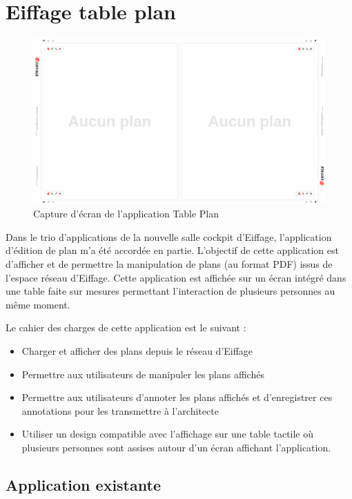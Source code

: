 \section{Eiffage table plan}
\label{eiffageTablePlan}

\begin{figure}[h]
    \centering
    \includegraphics[scale=0.5]{img/table-plan-capture.png}
    \caption{Capture d'écran de l'application Table Plan}
\end{figure}

Dans le trio d'applications de la nouvelle salle cockpit d'Eiffage, l'application d'édition de plan m'a été accordée en partie.
L'objectif de cette application est d'afficher et de permettre la manipulation de plans (au format PDF) issus de  l'espace réseau d'Eiffage.
Cette application est affichée sur un écran intégré dans une table faite sur mesures permettant l'interaction de plusieurs personnes au même moment.

Le cahier des charges de cette application est le suivant :
\begin{itemize}
    \item Charger et afficher des plans depuis le réseau d'Eiffage
    \item Permettre aux utilisateurs de manipuler les plans affichés
    \item Permettre aux utilisateurs d'annoter les plans affichés et d'enregistrer ces annotations pour les transmettre à l'architecte
    \item Utiliser un design compatible avec l'affichage sur une table tactile où plusieurs personnes sont assises autour d'un écran affichant l'application.
\end{itemize}

\subsection{Application existante}
\label{eiffageTablePlanApplicationExistante}

